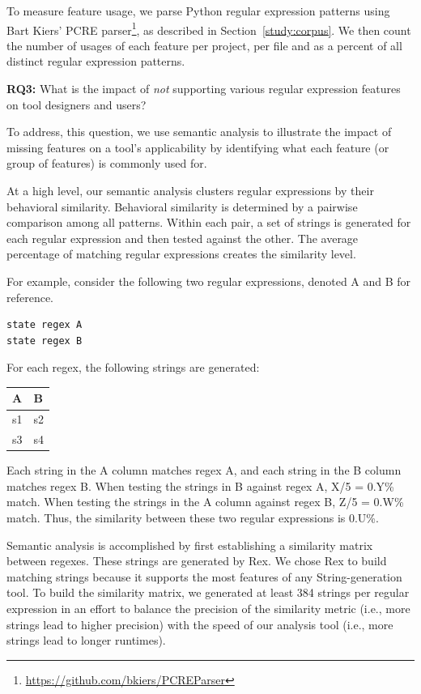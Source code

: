 To measure feature usage, we parse Python regular expression patterns using Bart Kiers' PCRE parser\footnote{\url{https://github.com/bkiers/PCREParser}}, as described in Section~\ref{study:corpus}.  We then count the number of usages of each feature per project, per file and as a percent of all distinct regular expression patterns.

\textbf{RQ3:} What is the impact of \emph{not} supporting various regular expression features on tool designers and users?

To address, this question, we use semantic analysis to illustrate the impact of missing features on a tool's applicability by identifying what each feature (or group of features) is commonly used for.

At a high level, our semantic analysis clusters regular expressions by their behavioral similarity. Behavioral similarity is determined by a pairwise comparison among all patterns. Within each pair, a set of strings is generated for each regular expression and then tested against the other. The average percentage of matching regular expressions creates the similarity level.

For example, consider the following two regular expressions, denoted A and B for reference.

\begin{verbatim}
state regex A
state regex B
\end{verbatim}

For each regex, the following strings are generated:

\begin{tabular}{l | l}
A & B \\ \hline
s1 & s2 \\
s3 & s4 \\
\end{tabular}

Each string in the A column matches regex A, and each string in the B column matches regex B. When testing the strings in B against regex A, X/5 = 0.Y\% match. When testing the strings in the A column against regex B, Z/5 = 0.W\% match. Thus, the similarity between these two regular expressions is 0.U\%.

Semantic analysis is accomplished by first establishing a similarity matrix between regexes. These strings are generated by Rex.  We chose Rex to build matching strings because it supports the most features of any String-generation tool. To build the similarity matrix, we generated at least 384 strings per regular expression in an effort to balance the precision of the similarity metric (i.e., more strings lead to higher precision) with the speed of our analysis tool (i.e., more strings lead to longer runtimes).

